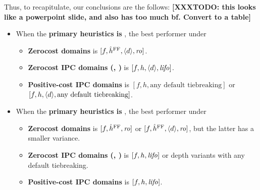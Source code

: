 \pagebreak[3]

Thus, to recapitulate, our conclusions are the follows:
{\bf [XXXTODO: this looks like a powerpoint slide, and also has too much bf. Convert to a table]}
\begin{itemize}
 \item When the \textbf{primary heuristics is \lmcut}, the best performer under
       \begin{itemize}
        \item \textbf{Zerocost domains} is $[f,\hat{h}^{\text{FF}},{\left<d\right>},{\text{\textit{ro}}}]$.
        \item \textbf{Zerocost IPC domains (, )} is $[f,h,{\left<d\right>},{\text{\textit{lifo}}}]$.
        \item \textbf{Positive-cost IPC domains} is $[f,h, \text{any default tiebreaking}]$ or $[f,h, {\left<d\right>}, \text{any default tiebreaking}]$.
       \end{itemize}
 \item When the \textbf{primary heuristics is \mands}, the best performer under
       \begin{itemize}
        \item \textbf{Zerocost domains} is $[f,\hat{h}^{\text{FF}},{\text{\textit{ro}}}]$ or $[f,\hat{h}^{\text{FF}},{\left<d\right>},{\text{\textit{ro}}}]$, but the latter has
              a smaller variance.
        \item \textbf{Zerocost IPC domains (, )} is $[f,h,{\text{\textit{lifo}}}]$ or depth variants with any default tiebreaking.
        \item \textbf{Positive-cost IPC domains} is $[f,h,{\text{\textit{lifo}}}]$.
       \end{itemize}
\end{itemize}

